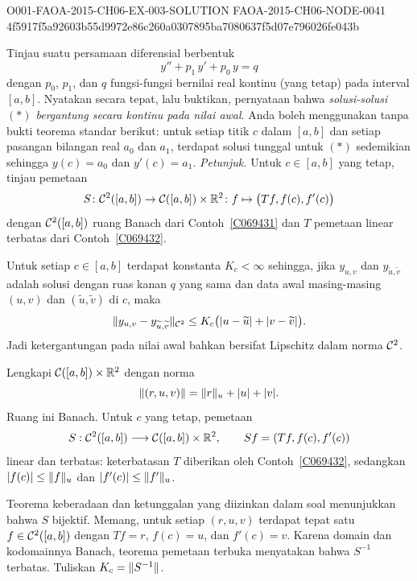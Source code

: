 \begin{o001solution}
  {O001-FAOA-2015-CH06-EX-003-SOLUTION}
  {FAOA-2015-CH06-NODE-0041}
  {4f5917f5a92603b55d9972e86c260a0307895ba7080637f5d07e796026fe043b}
\begin{o001statement}
Tinjau suatu persamaan diferensial berbentuk
   \[ y'' + p_1\,y' + p_0\,y = q  \tag{$\ast$} \]
dengan $p_0$, $p_1$, dan $q$ fungsi-fungsi bernilai real kontinu (yang tetap) pada interval
$[a,b]$.  Nyatakan secara tepat, lalu buktikan, pernyataan bahwa \emph{solusi-solusi $(\ast)$
bergantung secara kontinu pada nilai awal}.  Anda boleh menggunakan tanpa bukti teorema standar berikut:
untuk setiap titik $c$ dalam $[a,b]$ dan setiap pasangan bilangan real $a_0$ dan $a_1$,
terdapat solusi tunggal untuk $(\ast)$ sedemikian sehingga $y(c) = a_0$ dan $y'(c) = a_1$.
\emph{Petunjuk.} Untuk $c \in [a,b]$ yang tetap, tinjau pemetaan
  \[ S\colon \mathcal{C}^2([a,b]) \rightarrow \mathcal{C}([a,b]) \times \mathbb{R}^2 \colon
                                        f \mapsto \bigl(Tf,f(c),f'(c)\bigr) \]
dengan $\mathcal{C}^2([a,b])$ ruang Banach dari Contoh~\ref{C069431} dan $T$ pemetaan
linear terbatas dari Contoh~\ref{C069432}.
\end{o001statement}
\begin{o001answer}
Untuk setiap $c\in[a,b]$ terdapat konstanta $K_c<\infty$ sehingga, jika
$y_{u,v}$ dan $y_{\widetilde u,\widetilde v}$ adalah solusi dengan ruas kanan
$q$ yang sama dan data awal masing-masing $(u,v)$ dan
$(\widetilde u,\widetilde v)$ di $c$, maka
\[
 \lVert y_{u,v}-y_{\widetilde u,\widetilde v}\rVert_{\mathcal{C}^2}
 \le K_c\bigl(|u-\widetilde u|+|v-\widetilde v|\bigr).
\]
Jadi ketergantungan pada nilai awal bahkan bersifat Lipschitz dalam norma
$\mathcal{C}^2$.
\end{o001answer}
\begin{o001proof}
Lengkapi $\mathcal{C}([a,b])\times\mathbb{R}^2$ dengan norma
\[
  \lVert(r,u,v)\rVert=\lVert r\rVert_u+|u|+|v|.
\]
Ruang ini Banach. Untuk $c$ yang tetap, pemetaan
\[
 S:\mathcal{C}^2([a,b])\longrightarrow\mathcal{C}([a,b])\times\mathbb{R}^2,
 \qquad S f=(Tf,f(c),f'(c))
\]
linear dan terbatas: keterbatasan $T$ diberikan oleh Contoh~\ref{C069432},
sedangkan $|f(c)|\le\lVert f\rVert_u$ dan $|f'(c)|\le\lVert f'\rVert_u$.

Teorema keberadaan dan ketunggalan yang diizinkan dalam soal menunjukkan
bahwa $S$ bijektif. Memang, untuk setiap $(r,u,v)$ terdapat tepat satu
$f\in\mathcal{C}^2([a,b])$ dengan $Tf=r$, $f(c)=u$, dan $f'(c)=v$.
Karena domain dan kodomainnya Banach, teorema pemetaan terbuka menyatakan
bahwa $S^{-1}$ terbatas. Tuliskan $K_c=\lVert S^{-1}\rVert$.


\end{o001proof}
\end{o001solution}
